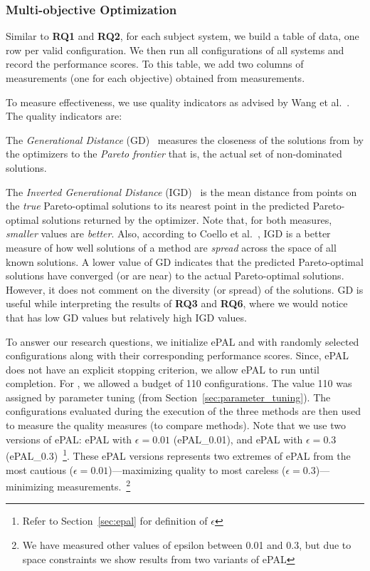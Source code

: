 \subsubsection{Multi-objective Optimization}\label{sec:exp_mo}
Similar to \textbf{RQ1} and \textbf{RQ2}, for each subject system, we build a table of data, one row per valid configuration. We then run all configurations of all systems and record the performance scores. To this table, we add two columns of measurements (one for each objective) obtained from measurements.



To measure effectiveness, we use quality indicators as advised by Wang et al.~\cite{wang2016practical}. The quality indicators are:
\bi[leftmargin=*]
\item
The \textit{Generational Distance} (GD)~\cite{van1999multiobjective} measures the closeness  of the solutions from by the optimizers to the 
{\em Pareto frontier} that is, the actual set of non-dominated solutions. 
\item
The \textit{Inverted Generational Distance} (IGD)~\cite{coello2004study}
is the mean distance from points on the  \textit{true} Pareto-optimal solutions to its nearest point in the predicted Pareto-optimal solutions returned by the optimizer.
\ei
Note that, for both measures, {\em smaller} values are {\em better}.
Also,
according to
Coello et al.~\cite{coello2004study}, IGD is a better measure of how well solutions of a method are {\em spread}   across the space of all known solutions. A lower value of GD indicates that the predicted Pareto-optimal solutions have converged (or are near) to the actual Pareto-optimal solutions. However, it does not comment on the diversity (or spread) of the solutions. GD is useful while interpreting the results of \textbf{RQ3} and \textbf{RQ6}, where we would notice that \flash has low GD values but relatively high IGD values.




To answer our research questions, we initialize ePAL and \flash with randomly selected configurations along with their corresponding performance scores. Since, ePAL does not have an explicit stopping criterion, we allow ePAL to run until completion. For \flash, we allowed a budget of 110 configurations. The value 110 was assigned by parameter tuning (from Section~\ref{sec:parameter_tuning}). The configurations evaluated during the execution of the three methods are then used to measure the quality measures (to compare methods).  Note that we use two versions of ePAL: ePAL with $\epsilon=0.01$ (ePAL\_0.01), and ePAL with $\epsilon=0.3$ (ePAL\_0.3)~\footnote{Refer to Section~\ref{sec:epal} for definition of $\epsilon$}. These ePAL versions represents two extremes of ePAL from the most cautious ($\epsilon=0.01$)---maximizing quality to most careless ($\epsilon=0.3$)---minimizing measurements.~\footnote{We have measured other values of epsilon between 0.01 and 0.3, but due to space constraints we show results from two variants of ePAL} 




